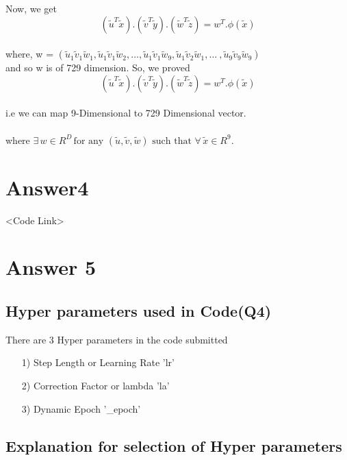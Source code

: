 \documentclass{article}
\begin{document}
Now, we get
\[(\tilde{u}^T\tilde{x}).(\tilde{v}^T\tilde{y}).(\tilde{w}^T\tilde{z}) = w^T.\phi(\tilde{x})\]\\
where, w = $(\tilde{u}_1\tilde{v}_1\tilde{w}_1, \tilde{u}_1\tilde{v}_1\tilde{w}_2, \dots , \tilde{u}_1\tilde{v}_1\tilde{w}_9, \tilde{u}_1\tilde{v}_2\tilde{w}_1, \dots\ , \tilde{u}_9\tilde{v}_9\tilde{w}_9)$\\

and so w is of 729 dimension. So, we proved\\
\[(\tilde{u}^T\tilde{x}).(\tilde{v}^T\tilde{y}).(\tilde{w}^T\tilde{z}) = w^T.\phi(\tilde{x})\]\\
i.e we can map 9-Dimensional to 729 Dimensional vector.\\\\
where $ \exists \, w \in R^D \, \text{for any } (\tilde{u},\tilde{v},\tilde{w} ) \text{ such that } \forall \, \tilde{x} \in R^9. $


\section{Answer4}
<Code Link>

\section{Answer 5}
\label{A5}
\subsection{Hyper parameters used in Code(Q4)}
There are 3 Hyper parameters in the code submitted\\
\begin{itemize}
\item[1)] Step Length or Learning Rate 'lr'
\item[2)] Correction Factor or lambda 'la'
\item[3)] Dynamic Epoch '\_epoch'
\end{itemize}


\subsection{Explanation for selection of Hyper parameters}
\end{document}
